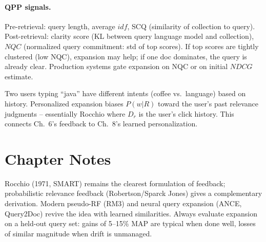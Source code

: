 \paragraph{QPP signals.} Pre-retrieval: query length, average $idf$, SCQ (similarity of collection to query). Post-retrieval: clarity score (KL between query language model and collection), $NQC$ (normalized query commitment: std of top scores). If top scores are tightly clustered (low NQC), expansion may help; if one doc dominates, the query is already clear. Production systems gate expansion on NQC or on initial $NDCG$ estimate.

\begin{remark}
Two users typing ``java'' have different intents (coffee vs.\ language) based on history. Personalized expansion biases $P(w|R)$ toward the user's past relevance judgments -- essentially Rocchio where $D_r$ is the user's click history. This connects Ch.~6's feedback to Ch.~8's learned personalization.
\end{remark}

\section{Chapter Notes}
Rocchio (1971, SMART) remains the clearest formulation of feedback; probabilistic relevance feedback (Robertson/Sparck Jones) gives a complementary derivation. Modern pseudo-RF (RM3) and neural query expansion (ANCE, Query2Doc) revive the idea with learned similarities. Always evaluate expansion on a held-out query set: gains of 5--15\% MAP are typical when done well, losses of similar magnitude when drift is unmanaged.

